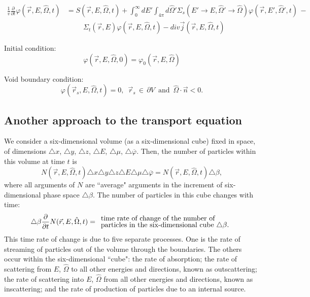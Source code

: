 \documentclass[12pt]{article}
\newcommand{\rvec}{\ensuremath{\vec{r}}}
\newcommand{\omvec}{\ensuremath{\hat{\Omega}}}
\begin{document}
\begin{align*}
\frac{1}{v}\frac{\partial}{\partial t}\varphi(\rvec, E, \omvec, t) &=
 S(\rvec, E, \omvec, t) +
 \int_0^{\infty}dE'\int_{4\pi}d\omvec'\Sigma_s(E'\rightarrow E,\omvec'\rightarrow\omvec)\varphi(\rvec,E',\omvec',t) \,-
\\& \hspace{1cm}\Sigma_{t}(\rvec,E)\varphi(\rvec,E,\omvec,t) - div \vec{j}(\rvec, E, \omvec,t)
\end{align*}

Initial condition:
\[
\varphi(\rvec, E, \omvec, 0) = \varphi_0(\rvec, E,\omvec)
\]

Void boundary condition:
\[
\varphi(\rvec_s, E, \omvec, t) = 0, \,\,\, \rvec_s \, \in \, \partial V \,\,\, \text{and} \,\,\, \omvec \cdot \vec{n} <0.
\]

\subsection*{Another approach to the transport equation}


We consider a six-dimensional volume (as a six-dimensional cube)
 fixed in space, of dimensions
$\triangle x$, $\triangle y$, $\triangle z$, $\triangle E$, $\triangle \mu$, $\triangle \overline\varphi$.
Then, the number of particles within this volume at time $t$ is
\begin{equation*}
N(\rvec,E,\omvec,t)\triangle x\triangle y\triangle z\triangle E\triangle \mu\triangle \overline\varphi =
N(\rvec,E,\omvec,t)\triangle \beta,
\end{equation*}
where all arguments of $N$ are ``average" arguments in the %
increment of six-dimensional phase space $\triangle \beta$.
The number of
particles in this cube changes with time:
\begin{equation*}
\triangle \beta\frac{\partial}{\partial t}N(\rvec,E,\omvec,t) = \begin{array}{l}
\text{time rate of change of the number of}\vspace{-0.1cm}\\
\text{particles in the six-dimensional cube $\triangle \beta$.}
\end{array}
\end{equation*}
 This time rate of change is due to five separate processes. One is the rate of streaming of
particles out of the volume through the boundaries. The others occur within the
six-dimensional ``cube": the rate
of absorption; the rate of scattering from $E$, $\omvec$ to all other energies and directions, known
as outscattering; the rate of scattering into $E$, $\omvec$ from all other energies and
 directions, known as inscattering; and the rate of production of particles due to an internal source.
\end{document}
